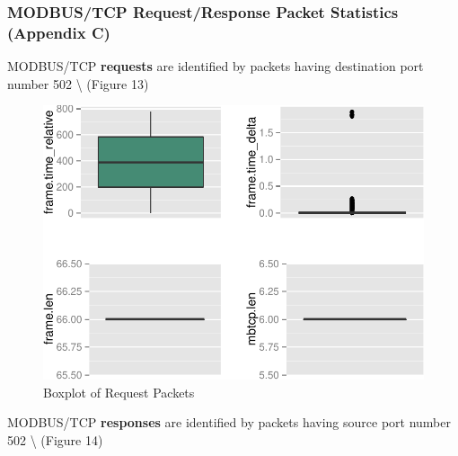 \documentclass[12pt,]{article}
\begin{document}
\clearpage

\subsubsection{MODBUS/TCP Request/Response Packet Statistics (Appendix
C)}\label{modbustcp-requestresponse-packet-statistics-appendix-c}

MODBUS/TCP \textbf{requests} are identified by packets having
destination port number 502 \textbackslash{} (Figure 13)

\nobreak

\begin{figure}

{\centering \includegraphics{thesis_files/figure-latex/unnamed-chunk-22-1} 

}

\caption{Boxplot of Request Packets}\label{fig:unnamed-chunk-22}
\end{figure}

\nobreak

MODBUS/TCP \textbf{responses} are identified by packets having source
port number 502 \textbackslash{} (Figure 14)

\nobreak
\end{document}
